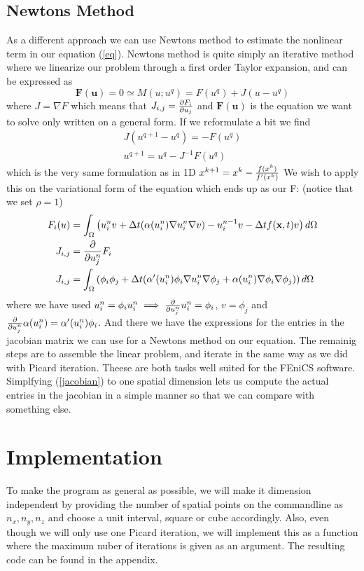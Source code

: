 \documentclass[a4paper,english, 10pt, twoside]{article}
\renewcommand{\d}{\partial}
\begin{document}
\subsection*{Newtons Method}
As a different approach we can use Newtons method to estimate the nonlinear term in our equation (\ref{eq}). Newtons method is quite simply 
an iterative method where we linearize our problem through a first order Taylor expansion, and can be expressed as
$$
\mathbf{F}(\mathbf{u}) = 0 \simeq M(u;u^q) = F(u^q) +J(u-u^q)
$$
where $J=\nabla F$ which means that $J_{i,j} = {\d F_i \over \d u_j}$ and $\mathbf{F}(\mathbf{u})$ is the equation we want to solve 
only written on a general form. If we reformulate a bit we find
\begin{align*}
 J(u^{q+1}-u^q) = -F(u^q) \\
 u^{q+1} = u^q-J^{-1}F(u^q)
\end{align*}
which is the very same formulation as in 1D $x^{k+1} = x^k - {f(x^k) \over f'(x^k)}$
We wish to apply this on the variational form of the equation which ends up as our F: (notice that we set $\rho=1$)
\begin{align}
\nonumber
F_i(u) &= \int_\Omega\left(u_i^nv +\Delta t(\alpha(u_i^n)\nabla u_i^n \nabla v) -u_i^{n-1}v -\Delta tf(\mathbf{x},t)v 
 \right)d\Omega \\ \nonumber
 J_{i,j} &= {\d \over \d u_j^n}F_i \\
 J_{i,j} &= \int_\Omega\left(\phi_i\phi_j +\Delta t(\alpha'(u_i^n)\phi_i\nabla u_i^n \nabla \phi_j + 
 \alpha(u_i^n)\nabla \phi_i\nabla\phi_j) \right)d\Omega \label{jacobian}
\end{align}
where we have used $u_i^n = \phi_i u_i^n \implies {\d \over \d u_j^n}u_i^n = \phi_i$, $v=\phi_j$ and ${\d \over \d u_j^n}\alpha(u_i^n) = 
\alpha'(u_i^n)\phi_i$. And there we have the expressions for the entries in the jacobian matrix we can use for a Newtons method 
on our equation. The remainig steps are to assemble the linear problem, and iterate in the same way as we did with Picard iteration. 
Theese are both tasks well suited for the FEniCS software.\\ 
Simplfying (\ref{jacobian}) to one spatial dimension lets us compute the actual entries in the jacobian in a simple manner 
so that we can compare with something else.

\section*{Implementation}
To make the program as general as possible, we will make it dimension independent by providing the number of spatial points on the commandline 
as $n_x, n_y, n_z$ and choose a unit interval, square or cube accordingly. Also, even though we will only use one Picard iteration, we will 
implement this as a function where the maximum nuber of iterations is given as an argument. The resulting code can be found in the appendix.
\end{document}
